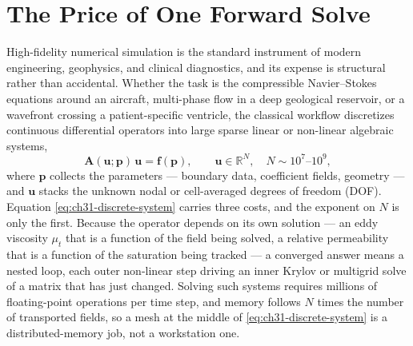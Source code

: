 \section{The Price of One Forward Solve}
\label{sec:ch31-one-solve}

High-fidelity numerical simulation is the standard instrument of modern engineering, geophysics,
and clinical diagnostics, and its expense is structural rather than accidental. Whether the task
is the compressible Navier--Stokes equations around an aircraft, multi-phase flow in a deep
geological reservoir, or a wavefront crossing a patient-specific ventricle, the classical
workflow discretizes continuous differential operators into large sparse linear or non-linear
algebraic systems,
\begin{equation}
  \mathbf{A}(\mathbf{u}; \mathbf{p})\, \mathbf{u} = \mathbf{f}(\mathbf{p}), \qquad
  \mathbf{u} \in \mathbb{R}^{N}, \quad N \sim 10^{7} \text{--} 10^{9},
  \label{eq:ch31-discrete-system}
\end{equation}
where $\mathbf{p}$ collects the parameters --- boundary data, coefficient fields, geometry ---
and $\mathbf{u}$ stacks the unknown nodal or cell-averaged degrees of freedom
(DOF). Equation
\eqref{eq:ch31-discrete-system} carries three costs, and the exponent on $N$ is only the first.
Because the operator depends on its own solution --- an eddy viscosity $\mu_{t}$ that is a function
of the field being solved, a relative permeability that is a function of the saturation being
tracked --- a converged answer means a nested loop, each outer non-linear step driving an inner
Krylov or multigrid solve of a matrix that has just changed.
Solving such systems requires millions of floating-point operations per time step, and memory
follows $N$ times the number of transported fields, so a mesh at the middle of
\eqref{eq:ch31-discrete-system} is a distributed-memory job, not a workstation one.

